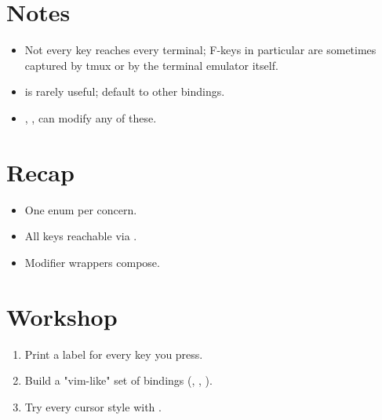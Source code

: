 \section{Notes}

\begin{itemize}[leftmargin=*]
  \item Not every key reaches every terminal; F-keys in
    particular are sometimes captured by tmux or by the
    terminal emulator itself.
  \item {} is rarely useful; default to other
    bindings.
  \item {}, , 
    can modify any of these.
\end{itemize}

\section{Recap}

\begin{recap}
\begin{itemize}[leftmargin=*]
  \item One enum per concern.
  \item All keys reachable via .
  \item Modifier wrappers compose.
\end{itemize}
\end{recap}

\section*{Workshop}

\begin{enumerate}[leftmargin=*]
  \item Print a label for every key you press.
  \item Build a "vim-like" set of bindings (,
    , ).
  \item Try every cursor style with .
\end{enumerate}
